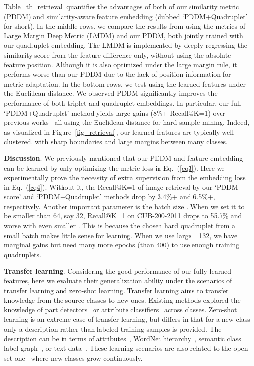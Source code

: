 \documentclass{article}
\begin{document}
Table~\ref{tb_retrieval} quantifies the advantages of both of our similarity metric (PDDM) and similarity-aware feature embedding (dubbed `PDDM+Quadruplet' for short). In the middle rows, we compare the results from using the metrics of Large Margin Deep Metric (LMDM) and our PDDM, both jointly trained with our quadruplet embedding. The LMDM is implemented by deeply regressing the similarity score from the feature difference only, without using the absolute feature position. Although it is also optimized under the large margin rule, it performs worse than our PDDM due to the lack of position information for metric adaptation. In the bottom rows, we test using the learned features under the Euclidean distance. We observed PDDM significantly improves the performance of both triplet and quadruplet embeddings. In particular, our full `PDDM+Quadruplet' method yields large gains (8\%+ Recall@K=1) over previous works~\cite{bell15productnet,Schroff2015,Wang2014,songCVPR16} all using the Euclidean distance for hard sample mining. Indeed, as visualized in Figure~\ref{fig_retrieval}, our learned features are typically well-clustered, with sharp boundaries and large margins between many classes.









\noindent \textbf{Discussion}.
We previously mentioned that our PDDM and feature embedding can be learned by only optimizing the metric loss  in Eq.~(\ref{eq3}). Here we experimentally prove the necessity of extra supervision from the embedding loss  in Eq.~(\ref{eq4}). Without it, the Recall@K=1 of image retrieval by our `PDDM score' and `PDDM+Quadruplet' methods drop by 3.4\%+ and 6.5\%+, respectively. Another important parameter is the batch size . When we set it to be smaller than 64, say 32, Recall@K=1 on CUB-200-2011 drops to 55.7\% and worse with even smaller . This is because the chosen hard quadruplet from a small batch makes little sense for learning. When we use large =132, we have marginal gains but need many more epochs (than 400) to use enough training quadruplets.

\noindent \textbf{Transfer learning}.
Considering the good performance of our fully learned features, here we evaluate their generalization ability under the scenarios of transfer learning and zero-shot learning. Transfer learning aims to transfer knowledge from the source classes to new ones. Existing methods explored the knowledge of part detectors~\cite{Lifeifei2006} or attribute classifiers~\cite{Lampert2014} across classes. Zero-shot learning is an extreme case of transfer learning, but differs in that for a new class only a description rather than labeled training samples is provided. The description can be in terms of attributes~\cite{Lampert2014}, WordNet hierarchy~\cite{Rohrbach2011,Mensink2013}, semantic class label graph~\cite{FuCVPR2015,RohrbachNIPS2013}, or text data~\cite{Frome2013,Norouzi2014}. These learning scenarios are also related to the open set one~\cite{Bendale2015} where new classes grow continuously.
\end{document}
